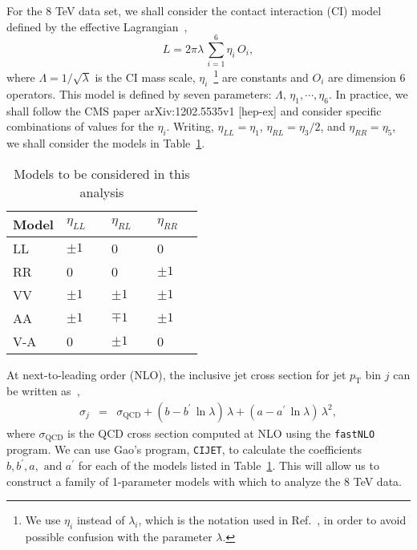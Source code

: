 \documentclass[aps,prd,preprint,nofootinbib]{revtex4}
\begin{document}
For the 8 TeV data set, we shall consider the contact interaction (CI) model defined by the effective
Lagrangian~\cite{bib:Gao},
\begin{equation}
	L = 2 \pi \lambda \, \sum_{i=1}^6 \eta_i \, O_i,
\end{equation}
where $\Lambda = 1/\sqrt{\lambda}$ is the CI mass scale, $\eta_i$~\footnote{We use $\eta_i$ instead of $\lambda_i$, which is the notation used in Ref.~\cite{bib:Gao}, in order to avoid possible confusion with the parameter $\lambda$.} are constants and $O_i$ are dimension 6 operators. 
This model is defined by seven parameters: $\Lambda$, $\eta_1,\cdots, \eta_6$. In practice,  we shall follow the CMS paper arXiv:1202.5535v1 [hep-ex] and consider specific combinations
of values for the $\eta_i$. 
Writing, $\eta_{LL} = \eta_1$, $\eta_{RL} = \eta_3 / 2$, and $\eta_{RR} = \eta_5$, we shall
consider the models in Table~\ref{tab:models}.
\begin{table}[htp]
\caption{Models to be considered in this analysis}
\label{tab:models}
\medskip
 \begin{tabular}{l|lll}
 \hline
 Model	&	$\eta_{LL}\quad$	&  $\eta_{RL}\quad$	& $\eta_{RR}\quad$ \\ \hline \hline
 LL		& 	$\pm 1$	 	& 0			& 0 \\
 RR		& 	0	 		& 0			& $\pm 1$ \\
 VV		& 	$\pm 1$	 	& $\pm 1$		& $\pm 1$ \\
 AA		& 	$\pm 1$	 	& $\mp 1$		& $\pm 1$ \\
 V-A		& 	0	 		& $\pm 1$			& 0 \
\end{tabular}
\end{table}
At next-to-leading order (NLO),  the inclusive jet cross section for jet $p_\text{T}$ bin $j$ can be written as~\cite{bib:CIJET},
\begin{eqnarray}
	\sigma_j 	& = & \sigma_\text{QCD} + (b - b^\prime \, \ln\lambda)  \, \lambda +  	
	 (a - a^\prime \, \ln\lambda)  \, \lambda^2	, 	
	 \label{eq:sigma}
\end{eqnarray}
where $\sigma_\text{QCD}$ is the QCD cross section computed at NLO using
the {\tt fastNLO} program. 
We can use Gao's program, {\tt CIJET}, to calculate the coefficients $b, b^\prime, a, \text{ and } a^\prime$ for each of the models listed in Table~\ref{tab:models}. This will allow us to
construct a family of 1-parameter models with which to analyze the 8 TeV data.
\end{document}
